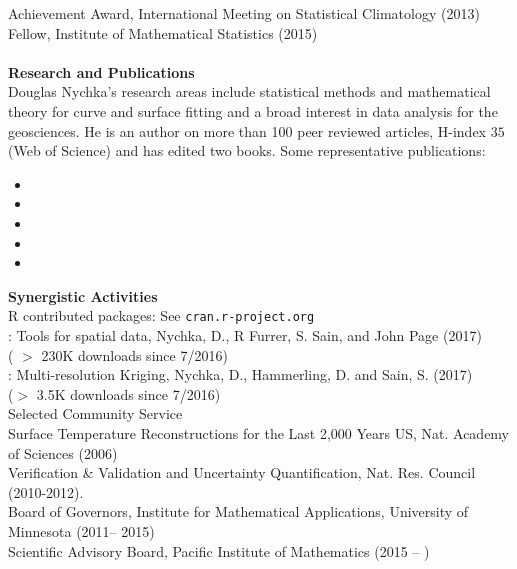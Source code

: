 \documentclass[10pt]{article}
\begin{document}
 Achievement Award, International  Meeting on Statistical Climatology (2013) \\
Fellow, Institute of Mathematical Statistics (2015) 
%
%
\\ \\  { \large \bf Research and Publications}  \\
Douglas Nychka's research areas include statistical methods  and mathematical theory for  curve
and surface fitting  and a broad interest in  data
analysis for the geosciences. 
He is an author on more than 100 peer reviewed articles, H-index $35$ (Web of Science)  and has edited two books. Some representative publications:
  \begin{itemize}
    \item {}
    \item {}
  \item {}
  \item {}
     \item {}
  \end{itemize}
{\large \bf Synergistic Activities} \\
R contributed packages: See  
\verb+cran.r-project.org+ 
\\
: Tools for spatial data,  Nychka, D.,   
  R Furrer, S. Sain, and John Page (2017)  \\
  ( $>$ 230K downloads since 7/2016)  
 \\
: Multi-resolution Kriging,
Nychka, D., Hammerling, D. and Sain, S.  (2017) \\
($>$ 3.5K downloads since 7/2016)
\\[.08in]
Selected Community Service  \\
 \indent  Surface
Temperature Reconstructions for the Last 2,000 Years 
US, Nat. Academy of Sciences (2006)
\\
 \indent   Verification \& Validation
 and Uncertainty Quantification,  Nat. Res. Council (2010-2012).
\\
 \indent Board of Governors, Institute for Mathematical Applications, 
University of Minnesota (2011-- 2015) 
\\
 \indent  Scientific Advisory Board, Pacific Institute of Mathematics (2015 -- )
\end{document}
